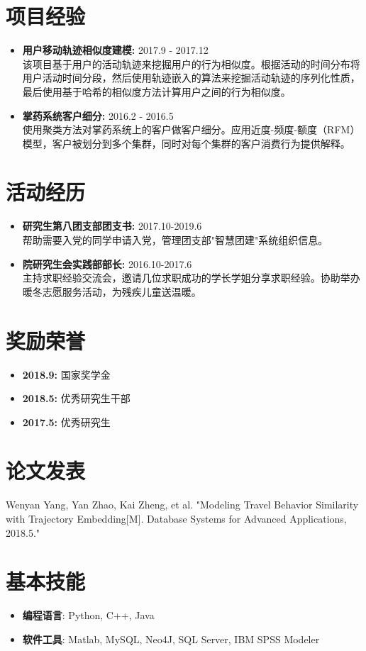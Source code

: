 \documentclass[letterpaper,11pt]{article}
\newcommand{\resumeItem}[2]{
  \item\small{
    \textbf{#1}{ #2 \vspace{-2pt}}
  }
}
\newcommand{\resumeSubItem}[2]{\resumeItem{#1}{#2}\vspace{-4pt}}
\newcommand{\resumeSubHeadingListStart}{\begin{itemize}[leftmargin=*]}
\newcommand{\resumeSubHeadingListEnd}{\end{itemize}}
\begin{document}
\begin{CJK*}{UTF8}{gbsn}
\section{项目经验}
  \resumeSubHeadingListStart
    \resumeSubItem{用户移动轨迹相似度建模:} 
      {2017.9 - 2017.12\\  该项目基于用户的活动轨迹来挖掘用户的行为相似度。根据活动的时间分布将用户活动时间分段，然后使用轨迹嵌入的算法来挖掘活动轨迹的序列化性质，最后使用基于哈希的相似度方法计算用户之间的行为相似度。}
    \resumeSubItem{掌药系统客户细分:}
      {2016.2 - 2016.5\\ 使用聚类方法对掌药系统上的客户做客户细分。应用近度-频度-额度（RFM）模型，客户被划分到多个集群，同时对每个集群的客户消费行为提供解释。}
  \resumeSubHeadingListEnd


\section{活动经历}
  \resumeSubHeadingListStart
    \resumeSubItem{研究生第八团支部团支书:}
    {2017.10-2019.6 \\ 帮助需要入党的同学申请入党，管理团支部"智慧团建"系统组织信息。}
    \resumeSubItem{院研究生会实践部部长:}
    {2016.10-2017.6 \\ 主持求职经验交流会，邀请几位求职成功的学长学姐分享求职经验。协助举办暖冬志愿服务活动，为残疾儿童送温暖。}
  \resumeSubHeadingListEnd
  
\section{奖励荣誉}
   \resumeSubHeadingListStart
   \resumeSubItem{2018.9:}
   {国家奖学金 \\ }
   \resumeSubItem{2018.5:}
   {优秀研究生干部 \\ }
   \resumeSubItem{2017.5:}
   {优秀研究生 \\ }
   \resumeSubHeadingListEnd

\section{论文发表}
Wenyan Yang, Yan Zhao, Kai Zheng, et al. "Modeling Travel Behavior Similarity with Trajectory Embedding[M]. Database Systems for Advanced Applications, 2018.5." 

\section{基本技能}%
 \resumeSubHeadingListStart
    \item{
     \textbf{编程语言}{: Python, C++, Java}
     } 
    \item{
     \textbf{软件工具}{: Matlab, MySQL, Neo4J, SQL Server, IBM SPSS Modeler}
    } 
 \resumeSubHeadingListEnd


\end{CJK*}
\end{document}
